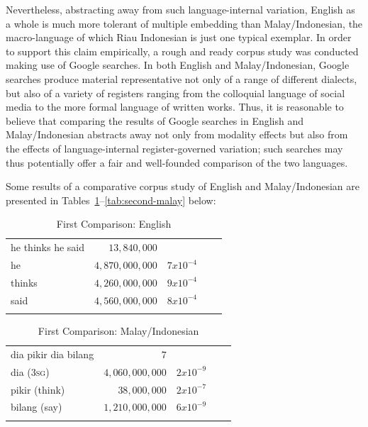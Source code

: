 \documentclass[output=paper,colorlinks,citecolor=brown
]{langscibook}
\begin{document}
Nevertheless, abstracting away from such language-internal variation, English as a whole is much more tolerant of multiple embedding than Malay/Indonesian, the macro-language of which Riau Indonesian is just one typical exemplar.  In order to support this claim empirically, a rough and ready corpus study was conducted making use of Google searches.  In both English and Malay/Indonesian, Google searches produce material representative not only of a range of different dialects, but also of a variety of registers ranging from the colloquial language of social media to the more formal language of written works.  Thus, it is reasonable to believe that comparing the results of Google searches in English and Malay/Indonesian abstracts away not only from modality effects but also from the effects of language-internal register-governed variation; such searches may thus potentially offer a fair and well-founded comparison of the two languages.

Some results of a comparative corpus study of English and Malay/Indonesian are presented in Tables~\ref{tab:first-english}--\ref{tab:second-malay} below:

\begin{table}
\caption{First Comparison: English}
\label{tab:first-english}
 \begin{tabularx}{.8\textwidth}{X rrrr}
 \lsptoprule
 he thinks he said & $13,840,000$ & {} \\
 he & $4,870,000,000$ & $7 x 10^{-4}$ \\
 thinks & $4,260,000,000$ & $9 x 10^{-4}$\\
 said & $4,560,000,000$ & $8 x 10^{-4}$\\
 \lspbottomrule
 \end{tabularx}
\end{table}

\begin{table}
\caption{First Comparison: Malay/Indonesian}
\label{tab:first-malay}
 \begin{tabularx}{.8\textwidth}{X rrrr}
 \lsptoprule
 dia pikir dia bilang & $7$ & {} \\
 dia (3\textsc{sg}) & $4,060,000,000$ & $2 x 10^{-9}$ \\
 pikir (think) & $38,000,000$ & $2 x 10^{-7}$\\
 bilang (say) & $1,210,000,000$ & $6 x 10^{-9}$\\
 \lspbottomrule
 \end{tabularx}
\end{table}
\end{document}
